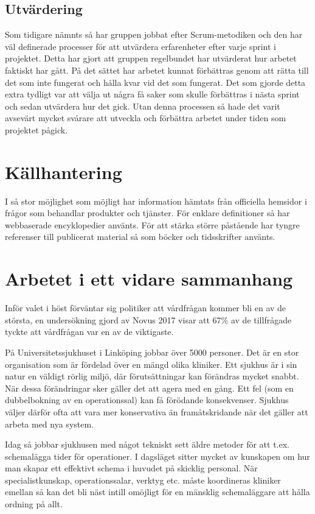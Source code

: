 \subsection{Utvärdering}
Som tidigare nämnts så har gruppen jobbat efter Scrum-metodiken och den har väl definerade processer för att utvärdera erfarenheter efter varje sprint i projektet. Detta har gjort att gruppen regelbundet har utvärderat hur arbetet faktiskt har gått. På det sättet har arbetet kunnat förbättras genom att rätta till det som inte fungerat och hålla kvar vid det som fungerat. Det som gjorde detta extra tydligt var att välja ut några få saker som skulle förbättras i nästa sprint och sedan utvärdera hur det gick. Utan denna processen så hade det varit avsevärt mycket svårare att utveckla och förbättra arbetet under tiden som projektet pågick.

\section{Källhantering} \label{sec:källhantering}
I så stor möjlighet som möjligt har information hämtats från officiella hemsidor i frågor som behandlar produkter och tjänster. För enklare definitioner så har webbaserade encyklopedier använts. För att stärka större påstående har tyngre referenser till publicerat material så som böcker och tidsskrifter använts.

\section{Arbetet i ett vidare sammanhang}\label{sec:vidare}

Inför valet i höst förväntar sig politiker att vårdfrågan kommer bli en av de största, en undersökning gjord av Novus 2017 visar att 67\% av de tillfrågade tyckte att vårdfrågan var en av de viktigaste.\cite{novus}

På Universitetssjukhuset i Linköping jobbar över 5000 personer. Det är en stor organisation som är fördelad över en mängd olika kliniker. Ett sjukhus är i sin natur en väldigt rörlig miljö, där förutsättningar kan förändras mycket snabbt. När dessa förändringar sker gäller det att agera med en gång. Ett fel (som en dubbelbokning av en operationssal) kan få förödande konsekvenser. Sjukhus väljer därför ofta att vara mer konservativa än framåtskridande när det gäller att arbeta med nya system.

Idag så jobbar sjukhusen med något tekniskt sett äldre metoder för att t.ex. schemalägga tider för operationer. I dagsläget sitter mycket av kunskapen om hur man skapar ett effektivt schema i huvudet på skicklig personal. När specialistkunskap, operationssalar, verktyg etc. måste koordineras kliniker emellan så kan det bli näst intill omöjligt för en mänsklig schemaläggare att hålla ordning på allt.


